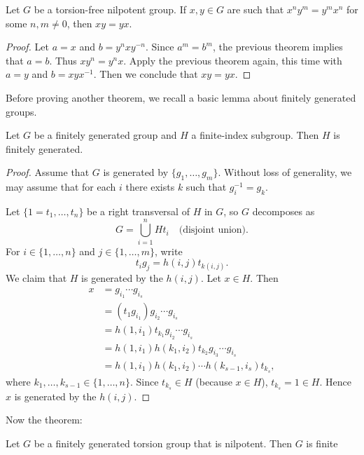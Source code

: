\begin{corollary}
Let $G$ be a torsion-free nilpotent group. If $x,y\in G$ are such that 
$x^ny^m=y^mx^n$ for some $n,m\ne 0$, then $xy=yx$.
\end{corollary}

\begin{proof}
Let $a=x$ and $b=y^nxy^{-n}$. Since $a^m=b^m$, the previous theorem implies that 
$a=b$. Thus $xy^n=y^nx$. Apply the previous theorem again, this time with 
$a=y$ and $b=xyx^{-1}$. Then we conclude that 
$xy=yx$. 
\end{proof}

Before proving another theorem, we recall a basic 
lemma about finitely generated groups. 

\begin{lemma}
\label{lem:fg}
Let $G$ be a finitely generated group and 
$H$ a finite-index subgroup. 
Then $H$ is finitely generated. 
\end{lemma}

\begin{proof}
Assume that $G$ is generated by $\{g_1,\dots,g_m\}$. Without loss of generality, we may assume that 
for each $i$ there exists $k$ such that $g_i^{-1}=g_k$. 
	
Let $\{1=t_1,\dots,t_n\}$ be a right transversal of $H$ in $G$, so $G$ decomposes as 
\[
G=\bigcup_{i=1}^n Ht_i\quad\text{(disjoint union).}
\]
For $i\in\{1,\dots,n\}$ 
and $j\in\{1,\dots,m\}$, write 
\[
t_ig_j=h(i,j)t_{k(i,j)}.
\]
We claim that $H$ is generated by the $h(i,j)$. Let $x\in H$. Then  
	\begin{align*}
	x &=g_{i_1}\cdots g_{i_s}\\
	&= (t_1g_{i_1})g_{i_2}\cdots g_{i_s}\\
	&= h(1,i_1)t_{k_1}g_{i_2}\cdots g_{i_s}\\
	&= h(1,i_1)h(k_1,i_2)t_{k_2}g_{i_3}\cdots g_{i_s}\\
	&= h(1,i_1)h(k_1,i_2)\cdots h(k_{s-1},i_s)t_{k_s},
	\end{align*}
where $k_1,\dots,k_{s-1}\in\{1,\dots,n\}$. Since $t_{k_s}\in H$ (because $x\in H$), 
$t_{k_s}=1\in H$. Hence  $x$ is generated by the $h(i,j)$.
\end{proof}

Now the theorem:

\begin{theorem}
\label{thm:T(G)finito}
Let $G$ be a finitely generated torsion group that is nilpotent. 
Then $G$ is finite 
\end{theorem}

